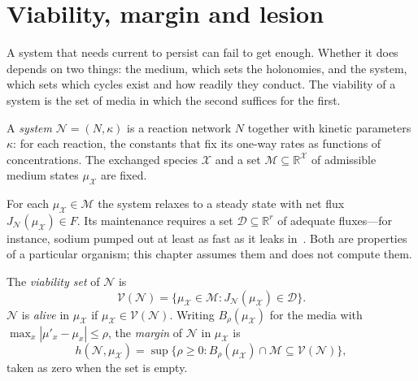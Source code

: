\section{Viability, margin and lesion}
\label{c1:sec-viability}

A system that needs current to persist can fail to get enough. Whether it
does depends on two things: the medium, which sets the holonomies, and the
system, which sets which cycles exist and how readily they conduct. The
viability of a system is the set of media in which the second suffices for
the first.

\begin{definition}[System]
\label{c1:def-kinetic}
A \emph{system} $\mathcal N=(N,\kappa)$ is a reaction network $N$ together
with kinetic parameters $\kappa$: for each reaction, the constants that fix
its one-way rates as functions of concentrations. The exchanged species
$\mathcal X$ and a set $\mathcal M\subseteq\mathbb R^{\mathcal X}$ of
admissible medium states $\mu_{\mathcal X}$ are fixed.
\end{definition}

\begin{inputstmt}
\label{c1:in-steady}
\lnkS{} For each $\mu_{\mathcal X}\in\mathcal M$ the system relaxes to a
steady state with net flux $J_{\mathcal N}(\mu_{\mathcal X})\in F$. Its
maintenance requires a set $\mathcal D\subseteq\mathbb R^{r}$ of adequate
fluxes---for instance, sodium pumped out at least as fast as it leaks
in~\citep{grace2018}. Both are properties of a particular organism; this
chapter assumes them and does not compute them.
\end{inputstmt}

\begin{definition}
\label{c1:def-viability}
The \emph{viability set} of $\mathcal N$ is
\[
\mathcal V(\mathcal N)=\{\mu_{\mathcal X}\in\mathcal M :
J_{\mathcal N}(\mu_{\mathcal X})\in\mathcal D\}.
\]
$\mathcal N$ is \emph{alive} in $\mu_{\mathcal X}$ if
$\mu_{\mathcal X}\in\mathcal V(\mathcal N)$. Writing $B_\rho(\mu_{\mathcal
X})$ for the media with $\max_x|\mu'_x-\mu_x|\le\rho$, the \emph{margin} of
$\mathcal N$ in $\mu_{\mathcal X}$ is
\[
h(\mathcal N,\mu_{\mathcal X})=\sup\{\rho\ge0:
B_\rho(\mu_{\mathcal X})\cap\mathcal M\subseteq\mathcal V(\mathcal N)\},
\]
taken as zero when the set is empty.
\end{definition}

